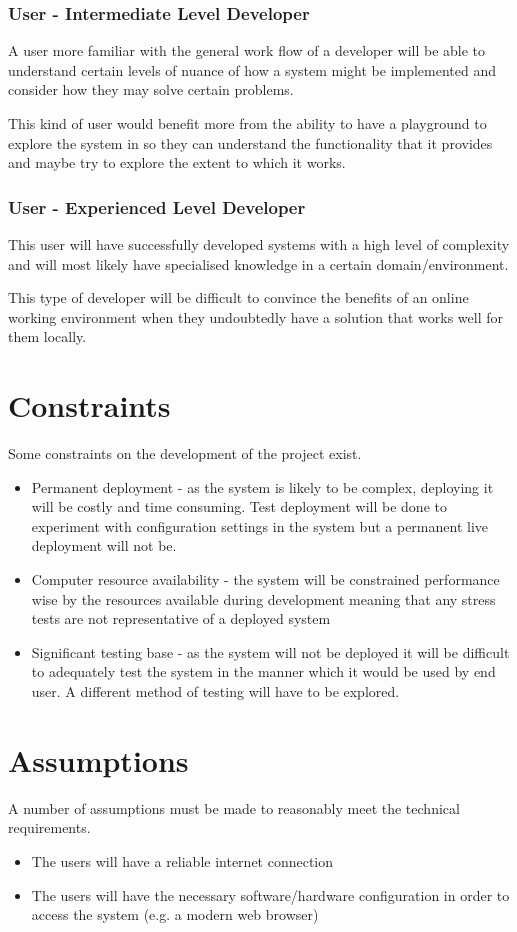 \subsubsection{User - Intermediate Level Developer}
A user more familiar with the general work flow of a developer will be able to understand certain levels of nuance of how a system might be implemented and consider how they may solve certain problems.

This kind of user would benefit more from the ability to have a playground to explore the system in so they can understand the functionality that it provides and maybe try to explore the extent to which it works.

\subsubsection{User - Experienced Level Developer}
This user will have successfully developed systems with a high level of complexity and will most likely have specialised knowledge in a certain domain/environment.

This type of developer will be difficult to convince the benefits of an online working environment when they undoubtedly have a solution that works well for them locally.

\section{Constraints} \label{section:probart-constraints}
Some constraints on the development of the project exist.

\begin{itemize}
    \item Permanent deployment - as the system is likely to be complex, deploying it will be costly and time consuming. Test deployment will be done to experiment with configuration settings in the system but a permanent live deployment will not be.
    \item Computer resource availability - the system will be constrained performance wise by the resources available during development meaning that any stress tests are not representative of a deployed system
    \item Significant testing base - as the system will not be deployed it will be difficult to adequately test the system in the manner which it would be used by end user. A different method of testing will have to be explored.
\end{itemize}

\section{Assumptions} \label{section:probart-assumptions}
A number of assumptions must be made to reasonably meet the technical requirements.

\begin{itemize}
    \item The users will have a reliable internet connection
    \item The users will have the necessary software/hardware configuration in order to access the system (e.g. a modern web browser)
\end{itemize}